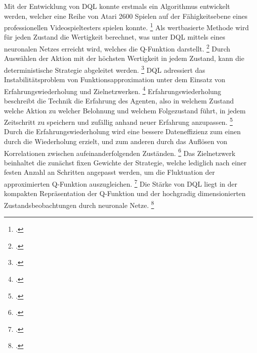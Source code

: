 Mit der Entwicklung von DQL konnte erstmals ein Algorithmus entwickelt werden, welcher eine Reihe von Atari 2600 Spielen auf der Fähigkeitsebene eines professionellen Videospieltesters spielen konnte. \footcite[Vgl.][S. 6]{Arulkumaran.2017}
Als wertbasierte Methode wird für jeden Zustand die Wertigkeit berechnet, was unter DQL mittels eines neuronalen Netzes erreicht wird, welches die Q-Funktion darstellt. \footcite[Vgl.][S. 4]{Huang.2017} %
Durch Auswählen der Aktion mit der höchsten Wertigkeit in jedem Zustand, kann die deterministische Strategie abgeleitet werden. \footcite[Vgl.][S. 4]{Huang.2017}
DQL adressiert das Instabilitätsproblem von Funktionsapproximation unter dem Einsatz von Erfahrungswiederholung und Zielnetzwerken. \footcite[Vgl.][S. 7]{Arulkumaran.2017}
Erfahrungswiederholung beschreibt die Technik die Erfahrung des Agenten, also in welchem Zustand welche Aktion zu welcher Belohnung und welchem Folgezustand führt, in jedem Zeitschritt zu speichern und zufällig anhand neuer Erfahrung anzupassen. \footcite[Vgl.][S. 4]{Mnih.2013} %
Durch die Erfahrungswiederholung wird eine bessere Dateneffizienz zum einen durch die Wiederholung erzielt, und zum anderen durch das Auflösen von Korrelationen zwischen aufeinanderfolgenden Zuständen. \footcite[Vgl.][S. 4f.]{Mnih.2013}
Das Zielnetzwerk beinhaltet die zunächst fixen Gewichte der Strategie, welche lediglich nach einer festen Anzahl an Schritten angepasst werden, um die Fluktuation der approximierten Q-Funktion auszugleichen. \footcite[Vgl.][S. 7]{Arulkumaran.2017}
Die Stärke von DQL liegt in der kompakten Repräsentation der Q-Funktion und der hochgradig dimensionierten Zustandsbeobachtungen durch neuronale Netze. \footcite[Vgl.][S. 7]{Arulkumaran.2017}

